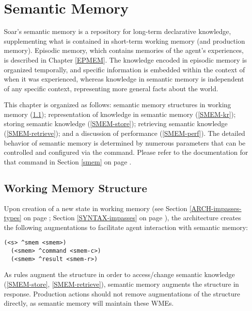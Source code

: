 \chapter{Semantic Memory}
\label{SMEM}

Soar's semantic memory is a repository for long-term declarative knowledge, supplementing what is contained in short-term working memory (and production memory).
Episodic memory, which contains memories of the agent's experiences, is described in Chapter \ref{EPMEM}.
The knowledge encoded in episodic memory is organized temporally, and specific information is embedded within the context of when it was experienced, whereas knowledge in semantic memory is independent of any specific context, representing more general facts about the world.

This chapter is organized as follows: semantic memory structures in working memory (\ref{SMEM-wm}); representation of knowledge in semantic memory (\ref{SMEM-kr}); storing semantic knowledge (\ref{SMEM-store}); retrieving semantic knowledge (\ref{SMEM-retrieve}); and a discussion of performance (\ref{SMEM-perf}).
The detailed behavior of semantic memory is determined by numerous parameters that can be controlled and configured via the  command.
Please refer to the documentation for that command in Section \ref{smem} on page \pageref{smem}.


\section{Working Memory Structure}
\label{SMEM-wm}

Upon creation of a new state in working memory (see Section \ref{ARCH-impasses-types} on page \pageref{ARCH-impasses-types}; Section \ref{SYNTAX-impasses} on page \pageref{SYNTAX-impasses}), the architecture creates the following augmentations to facilitate agent interaction with semantic memory:

\begin{verbatim}
(<s> ^smem <smem>)
  (<smem> ^command <smem-c>)
  (<smem> ^result <smem-r>)
\end{verbatim}

As rules augment the  structure in order to access/change semantic knowledge (\ref{SMEM-store}, \ref{SMEM-retrieve}), semantic memory augments the  structure in response.
Production actions should not remove augmentations of the  structure directly, as semantic memory will maintain these WMEs.



